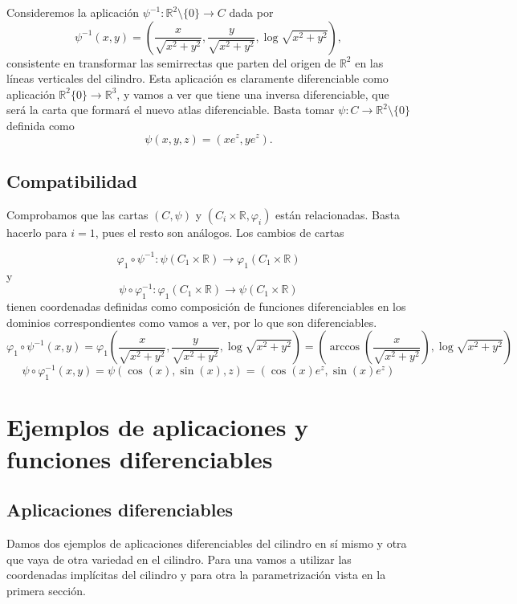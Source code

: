 \documentclass[twoside, 11pt]{article}
\theoremstyle{definition}
\newcommand{\R}{\mathbb{R}}
\begin{document}
Consideremos la aplicación $\psi^{-1}:\R^2 \setminus\{0\}\to C$ dada por $$\psi^{-1}(x,y)=\left(\frac{x}{\sqrt{x^2+y^2}},\frac{y}{\sqrt{x^2+y^2}}, \log\sqrt{x^2+y^2} \right),$$ consistente en transformar las semirrectas que parten del origen de $\R^2$ en las líneas verticales del cilindro. Esta aplicación es claramente diferenciable como aplicación $\R^2\{0\}\to\R^3$, y vamos a ver que tiene una inversa diferenciable, que será la carta que formará el nuevo atlas diferenciable. Basta tomar $\psi:C\to\R^2\setminus\{0\}$ definida como $$\psi(x,y,z)=(xe^z,ye^z).$$ 

\subsection{Compatibilidad}

Comprobamos que las cartas $(C, \psi)$ y $(C_i\times\R, \varphi_i)$ están relacionadas. Basta hacerlo para $i=1$, pues el resto son análogos. Los cambios de cartas

\[
\varphi_1\circ \psi^{-1}: \psi(C_1\times\R)\to \varphi_1(C_1\times\R)
\]
y 
\[
\psi\circ\varphi_1^{-1} : \varphi_1(C_1\times\R)\to \psi(C_1\times\R)
\]
tienen coordenadas definidas como composición de funciones diferenciables en los dominios correspondientes como vamos a ver, por lo que son diferenciables. 
\[
\varphi_1\circ \psi^{-1}(x,y)=\varphi_1\left(\frac{x}{\sqrt{x^2+y^2}},\frac{y}{\sqrt{x^2+y^2}}, \log\sqrt{x^2+y^2} \right)=\left(\arccos\left(\frac{x}{\sqrt{x^2+y^2}}\right),  \log\sqrt{x^2+y^2} \right)
\]
\[
\psi\circ\varphi_1^{-1}(x,y)=\psi(\cos(x),\sin(x),z)=(\cos(x)e^z,\sin(x)e^z)
\]

\section{Ejemplos de aplicaciones y funciones diferenciables}

\subsection{Aplicaciones diferenciables}
Damos dos ejemplos de aplicaciones diferenciables del cilindro en sí mismo y otra que vaya de otra variedad en el cilindro. Para una vamos a utilizar las coordenadas implícitas del cilindro y para otra la parametrización vista en la primera sección. 
\end{document}
